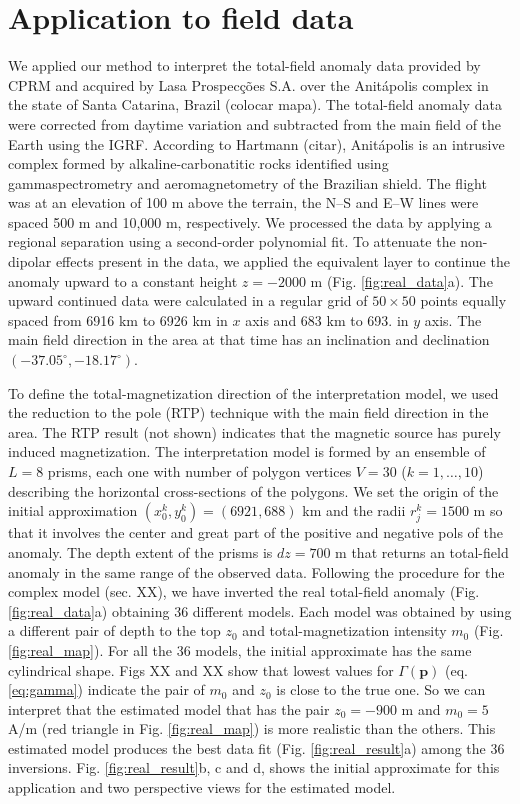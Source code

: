 \section{Application to field data}

We applied our method to interpret the total-field anomaly data provided by CPRM and acquired by Lasa Prospecções S.A. over the Anitápolis complex in the state of Santa Catarina, Brazil (colocar mapa). The total-field anomaly data were corrected from daytime variation and subtracted from the main field of the Earth using the IGRF. According to Hartmann (citar), Anitápolis is an intrusive complex formed by alkaline-carbonatitic rocks identified using gammaspectrometry and aeromagnetometry of the Brazilian shield. The flight was at an elevation of 100 m above the terrain, the N–S and E–W lines were spaced 500 m and 10,000 m, respectively. We processed the data by applying a regional separation using a second-order polynomial fit. To attenuate the non-dipolar effects present in the data, we applied the equivalent layer to continue the anomaly upward to a constant height $z=-2000$ m (Fig. \ref{fig:real_data}a). The upward continued data were calculated in a regular grid of $50\times50$ points equally spaced from 6916 km to 6926 km in $x$ axis and 683 km to 693. in $y$ axis. The main field direction in the area at that time has an inclination and declination $(-37.05^\circ, -18.17^\circ)$.

To define the total-magnetization direction of the interpretation model, we used the reduction to the pole (RTP) technique with the main field direction in the area. The RTP result (not shown) indicates that the magnetic source has purely induced magnetization. The interpretation model is formed by an ensemble of $L = 8$ prisms, each one with number of polygon vertices $V = 30$ ($k = 1, \dots , 10$) describing the horizontal cross-sections of the polygons. We set the origin of the initial approximation $(x_0^k, y_0^k) = (6921, 688)$ km and the radii $r_j^k = 1500$ m so that it involves the center and great part of the positive and negative pols of the anomaly. The depth extent of the prisms is $dz = 700$ m that returns an total-field anomaly in the same range of the observed data. Following the procedure for the complex model (sec. XX), we have inverted the real total-field anomaly (Fig. \ref{fig:real_data}a) obtaining 36 different models. Each model was obtained by using a different pair of depth to the top $z_0$ and total-magnetization intensity $m_0$ (Fig. \ref{fig:real_map}). For all the 36 models, the initial approximate has the same cylindrical shape. Figs XX and XX show that lowest values for $\Gamma(\mathbf{p})$ (eq. \ref{eq:gamma}) indicate the pair of $m_0$ and $z_0$ is close to the true one. So we can interpret that the estimated model that has the pair $z_0 = -900$ m and $m_0 = 5$ A/m (red triangle in Fig. \ref{fig:real_map}) is more realistic than the others. This estimated model produces the best data fit (Fig. \ref{fig:real_result}a) among the 36 inversions. Fig. \ref{fig:real_result}b, c and d, shows the initial approximate for this application and two perspective views for the estimated model.
